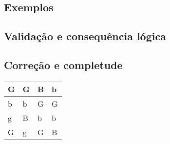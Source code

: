     \subsection{Exemplos}
    
    \subsection{Validação e consequência lógica}
    
    \subsection{Correção e completude}
    
    \begin{table}[htb]
      \centering
      \begin{tabular}{|l|l|l|l|}
      \hline
      G          & G          & B     &b           \\ \hline
      b          & b          & G     &G           \\ \hline
      g          & B          & b     &b            \\ \hline
      G          & g          & G     &B            \\ \hline
      
      \end{tabular}
      \end{table}
